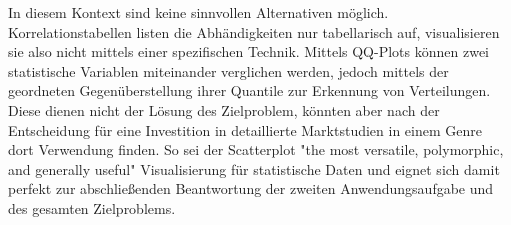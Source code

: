 \documentclass[usegeometry=true]{scrartcl}
\begin{document}
In diesem Kontext sind keine sinnvollen Alternativen möglich. 
Korrelationstabellen listen die Abhändigkeiten nur tabellarisch auf, visualisieren sie also nicht mittels einer spezifischen Technik.
Mittels QQ-Plots können zwei statistische Variablen miteinander verglichen werden, jedoch mittels der geordneten Gegenüberstellung ihrer Quantile zur Erkennung von Verteilungen.
Diese dienen nicht der Lösung des Zielproblem, könnten aber nach der Entscheidung für eine Investition in detaillierte Marktstudien in einem Genre dort Verwendung finden.
So sei der Scatterplot "the most versatile, polymorphic, and generally useful"\cite[103]{Friendly.2005} Visualisierung für statistische Daten und eignet sich damit perfekt zur abschließenden Beantwortung der zweiten Anwendungsaufgabe und des gesamten Zielproblems.




\end{document}
